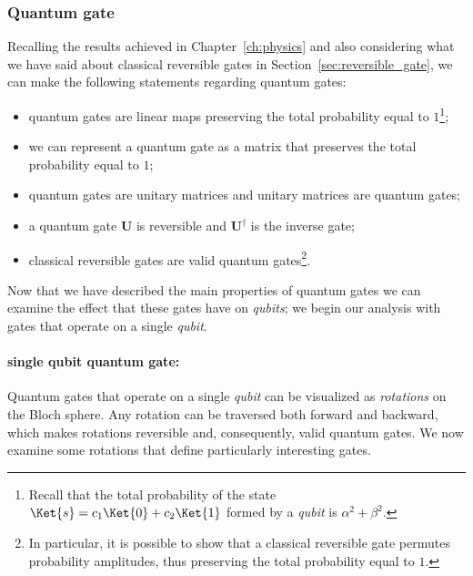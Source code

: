 \subsubsection*{Quantum gate}
\label{sec:quantum_gate}
Recalling the results achieved in Chapter~\ref{ch:physics} and also considering what we have said about classical reversible gates in Section~\ref{sec:reversible_gate}, we can make the following statements regarding quantum gates:
\begin{itemize}
	\item quantum gates are linear maps preserving the total probability equal to $1$\footnote{Recall that the total probability of the state $\Ket{s} = c_1 \Ket{0} + c_2  \Ket{1}$ formed by a \emph{qubit} is $\alpha^2 + \beta^2$.};
	\item we can represent a quantum gate as a matrix that preserves the total probability equal to $1$;
	\item quantum gates are unitary matrices and unitary matrices are quantum gates;
	\item a quantum gate $\mathbf{U}$ is reversible and $\mathbf{U}^\dagger$ is the inverse gate;
	\item classical reversible gates are valid quantum gates\footnote{In particular, it is possible to show that a classical reversible gate permutes probability amplitudes, thus preserving the total probability equal to $1$.}.
\end{itemize}

Now that we have described the main properties of quantum gates we can examine the effect that these gates have on \emph{qubits}; we begin our analysis with gates that operate on a single \emph{qubit}.
\paragraph{single qubit quantum gate:} Quantum gates that operate on a single \emph{qubit} can be visualized as \emph{rotations} on the Bloch sphere. Any rotation can be traversed both forward and backward, which makes rotations reversible and, consequently, valid quantum gates. We now examine some rotations that define particularly interesting gates.


